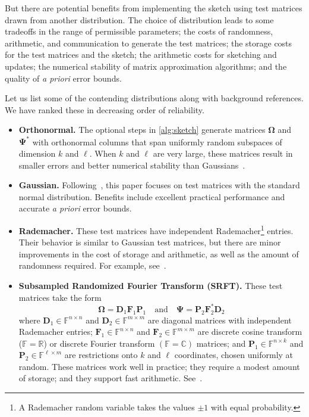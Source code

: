 \documentclass[final]{siamart1116}
\numberwithin{equation}{section}
\numberwithin{theorem}{section}
\numberwithin{figure}{section}
\newcommand{\R}{\mathbb{R}}
\newcommand{\C}{\mathbb{C}}
\newcommand{\F}{\mathbb{F}}
\newcommand{\mtx}[1]{\bm{#1}}
\begin{document}
But there are potential benefits from implementing the sketch using test matrices
drawn from another distribution. The choice of distribution leads to some tradeoffs in
the range of permissible parameters; the costs of randomness, arithmetic, and communication to generate
the test matrices; the storage costs for the test matrices and the sketch;
the arithmetic costs for sketching and updates;
the numerical stability of matrix approximation algorithms;
and the quality of \emph{a priori} error bounds.

Let us list some of the contending distributions along with background references.
We have ranked these in decreasing order of reliability.

\vspace{0.5pc}

\begin{itemize} \setlength{\itemsep}{0.5pc}
\item	\textbf{Orthonormal.}  The optional steps in \cref{alg:sketch} generate
matrices $\mtx{\Omega}$ and $\mtx{\Psi}^*$ with orthonormal columns that span uniformly
random subspaces of dimension $k$ and $\ell$.  When $k$ and $\ell$ are very large,
these matrices result in smaller errors and better numerical stability than
Gaussians~\cite{DDH07:Fast-Linear,HMT11:Finding-Structure}.

\item	\textbf{Gaussian.}  Following~\cite{MRT11:Randomized-Algorithm,HMT11:Finding-Structure},
this paper focuses on test matrices with the standard normal distribution.
Benefits include excellent practical performance and accurate \emph{a priori} error bounds.

\item	\textbf{Rademacher.}  These test matrices have independent Rademacher\footnote{A Rademacher random variable
takes the values $\pm 1$ with equal probability.}
entries.
Their behavior is similar to Gaussian test matrices, but there
are minor improvements in the cost of storage and arithmetic, as well as
the amount of randomness required.  For example, see~\cite{CW09:Numerical-Linear}.

\item	\textbf{Subsampled Randomized Fourier Transform (SRFT).}
These test matrices take the form
\begin{equation} \label{eqn:srft}
\mtx{\Omega} = \mtx{D}_1 \mtx{F}_1 \mtx{P}_1
\quad\text{and}\quad
\mtx{\Psi} = \mtx{P}_2 \mtx{F}_2^* \mtx{D}_2
\end{equation}
where $\mtx{D}_1 \in \F^{n \times n}$ and $\mtx{D}_2 \in \F^{m \times m}$
are diagonal matrices with independent Rademacher entries; $\mtx{F}_1 \in \F^{n \times n}$
and $\mtx{F}_2 \in \F^{m \times m}$ are discrete cosine transform ($\F = \R$)
or discrete Fourier transform $(\F = \C)$ matrices;
and $\mtx{P}_1 \in \F^{n \times k}$ and $\mtx{P}_2 \in \F^{\ell \times m}$
are restrictions onto $k$ and $\ell$ coordinates, chosen uniformly at random.
These matrices work well in practice; they require a modest amount of storage;
and they support fast arithmetic.
See~\cite{AC06:Approximate-Nearest,WLRT08:Fast-Randomized,AC09:Fast-Johnson-Lindenstrauss,HMT11:Finding-Structure,Tro11:Improved-Analysis,BG13:Improved-Matrix,CNW16:Optimal-Approximate}.


\end{itemize}
\end{document}
